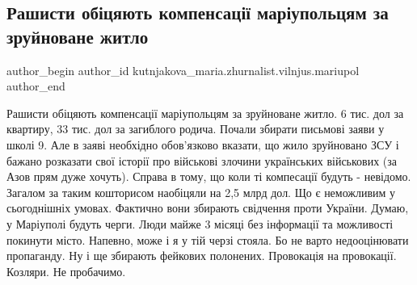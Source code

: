  
 
 
 
 

\subsection{Рашисти обіцяють компенсації маріупольцям за зруйноване житло}
\label{sec:16_05_2022.fb.kutnjakova_maria.zhurnalist.vilnjus.mariupol.1.rashisti_ob_tsyayut_}

\ifcmt
 author_begin
   author_id kutnjakova_maria.zhurnalist.vilnjus.mariupol
 author_end
\fi

Рашисти обіцяють компенсації маріупольцям за зруйноване житло. 6 тис. дол за
квартиру, 33 тис. дол за загиблого родича. Почали збирати письмові заяви у
школі 9. Але в заяві необхідно обов'язково вказати, що жило зруйновано ЗСУ і
бажано розказати свої історії про військові злочини українських військових (за
Азов прям дуже хочуть). Справа в тому, що коли ті компесації будуть - невідомо.
Загалом за таким кошторисом наобіцяли на 2,5 млрд дол. Що є неможливим у
сьогоднішніх умовах. Фактично вони збирають свідчення проти України. Думаю, у
Маріуполі будуть черги. Люди майже 3 місяці без інформації та можливості
покинути місто. Напевно, може і я у тій черзі стояла. Бо не варто недооцінювати
пропаганду. Ну і ще збирають фейкових полонених. Провокація на провокації.
Козляри. Не пробачимо.
